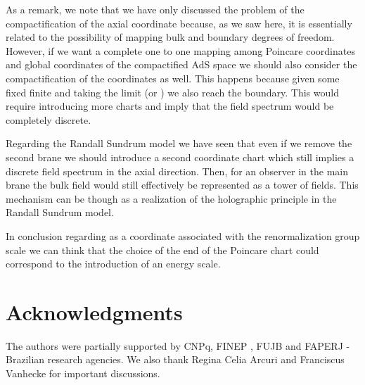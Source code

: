 \documentclass[a4paper,12pt]{article}
\begin{document}
As a remark, we note that we have only discussed the problem of 
the compactification of the axial coordinate \coordHE{} because, as we saw here, 
it is essentially 
related to the possibility of mapping bulk and boundary degrees of freedom.
However, if we want a complete one to one mapping among Poincare coordinates 
and global coordinates of the compactified AdS space we should also consider
the compactification of the \coordHE{} coordinates as well.
This happens because given some fixed finite \coordHE{} and taking the limit 
\coordHE{}  (or \coordHE{}) 
we also reach the boundary. 
This would require introducing more charts and imply that the 
field spectrum would be completely discrete.


Regarding the Randall Sundrum model we have seen that even if 
we remove the second brane we should introduce a second coordinate chart
which still implies a discrete field spectrum 
in the axial direction.
Then, for an observer in the main brane the bulk field would still 
effectively be represented as  a tower of fields. 
This mechanism can be though as a realization of the holographic
principle in the Randall Sundrum model.

In conclusion regarding \coordHE{} as a coordinate associated with the 
renormalization group scale\cite{Ver,Ran} we can think that
the choice of the end of the Poincare chart could correspond to
the introduction of an energy scale.
 



 

\section*{Acknowledgments} 
The authors were partially supported by CNPq, FINEP , FUJB and FAPERJ
- Brazilian research agencies. We also thank  Regina Celia Arcuri
and Franciscus Vanhecke for important discussions.

  
\end{document}
